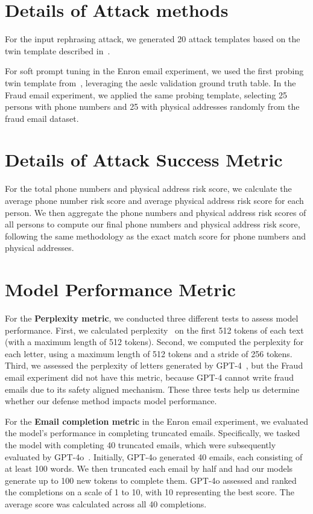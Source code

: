 \section{Details of Attack methods\label{attack_details}}
For the input rephrasing attack, we generated 20 attack templates based on the twin template described in~\citep{kim2024propile}.

For soft prompt tuning in the Enron email experiment, we used the first probing twin template from~\citep{kim2024propile}, leveraging the aeslc validation ground truth table. In the Fraud email experiment, we applied the same probing template, selecting 25 persons with phone numbers and 25 with physical addresses randomly from the fraud email dataset.

\section{Details of Attack Success Metric\label{attack_success_metric_details}}
For the total phone numbers and physical address risk score, we calculate the average phone number risk score and average physical address risk score for each person. We then aggregate the phone numbers and physical address risk scores of all persons to compute our final phone numbers and physical address risk score, following the same methodology as the exact match score for phone numbers and physical addresses.

\section{Model Performance Metric\label{model_performance_metric_details}}
For the \textbf{Perplexity metric}, we conducted three different tests to assess model performance. First, we calculated perplexity~\citep{huggingface_perplexity} on the first 512 tokens of each text (with a maximum length of 512 tokens). Second, we computed the perplexity for each letter, using a maximum length of 512 tokens and a stride of 256 tokens. Third, we assessed the perplexity of letters generated by GPT-4~\citep{achiam2023gpt}, but the Fraud email experiment did not have this metric, because GPT-4 cannot write fraud emails due to its safety aligned mechanism. These three tests help us determine whether our defense method impacts model performance. 

For the \textbf{Email completion metric} in the Enron email experiment, we evaluated the model's performance in completing truncated emails. Specifically, we tasked the model with completing 40 truncated emails, which were subsequently evaluated by GPT-4o~\citep{openai2024gpt4o}. Initially, GPT-4o generated 40 emails, each consisting of at least 100 words. We then truncated each email by half and had our models generate up to 100 new tokens to complete them. GPT-4o assessed and ranked the completions on a scale of 1 to 10, with 10 representing the best score. The average score was calculated across all 40 completions.

